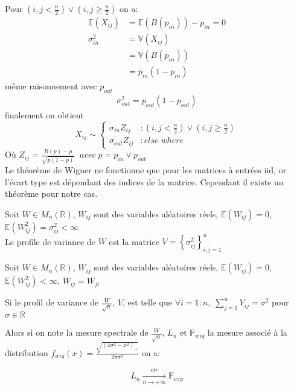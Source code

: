 Pour $(i,j < \frac{n}{2}) \lor (i,j \ge \frac{n}{2}) $ on a:
\begin{align*}
\mathbb{E}(X_{ij}) &= \mathbb{E}(B(p_{in}))- p_{in} = 0\\
\sigma_{in}^2 &= \mathbb{V}(X_{ij}) \\ 
			  &= \mathbb{V}(B(p_{in})) \\
			  &= p_{in} (1 - p_{in})
\end{align*}
même raisonnement avec $p_{out}$ 
\begin{align*}
\sigma_{out}^2 =  p_{out} (1 - p_{out})
\end{align*}
finalement on obtient 
\begin{equation}
	X_{ij} \sim \left\{
	\begin{array}{lr}
		\sigma_{in} Z_{ij} & : (i,j < \frac{n}{2}) \lor (i,j \ge \frac{n}{2}) \\
		\sigma_{out} Z_{ij} & : else \; where
	\end{array}
\right.\nonumber
\end{equation}
Où $Z_{ij} = \frac{B(p) - p}{\sqrt{p(1-p)}} \;\;avec \; p = p_{in} \lor p_{out}$\\

Le théorème de Wigner ne fonctionne que pour les matrices à entrées iid, or l'écart type est dépendant des indices de la matrice.
Cependant il existe un théorème pour notre cas.
\begin{mydef}
Soit $W \in M_{n}(\mathbb{R})$, $W_{ij}$ sont des variables aléatoires réels, $\mathbb{E}(W_{ij}) = 0$, $\mathbb{E}(W_{ij}^2) = \sigma_{ij}^2< \infty$\\

Le profile de variance de $W$ est la matrice $V=\left\{ \sigma_{ij}^2 \right\}_{i,j=1}^n$
\end{mydef}

\begin{theorem}\label{th:1}
Soit $W \in M_{n}(\mathbb{R})$, $W_{ij}$ sont des variables aléatoires réels, $\mathbb{E}(W_{ij}) = 0$, $\mathbb{E}(W_{ij}^2) < \infty$, $W_{ij} = W_{ji}$

Si le profil de variance de $\frac{W}{\sqrt{n}}$, $V$, est telle que $\forall i = 1:n , \; \sum_{j=1}^{n}V_{ij} = \sigma^2$ pour $\sigma \in \mathbb{R}$

Alors si on note la mesure spectrale de $\frac{W}{\sqrt{n}}$, $L_{n}$  et $\mathbb{P}_{wig}$ la mesure associé à la distribution $f_{wig}(x)= \frac{\sqrt{(4\sigma^2 - x^2)_+}}{2\pi\sigma^2}$ on a:

\begin{equation}
	L_n\xrightarrow[n \to +\infty]{etr} \mathbb{P}_{wig}\nonumber
\end{equation}\\
\end{theorem}

